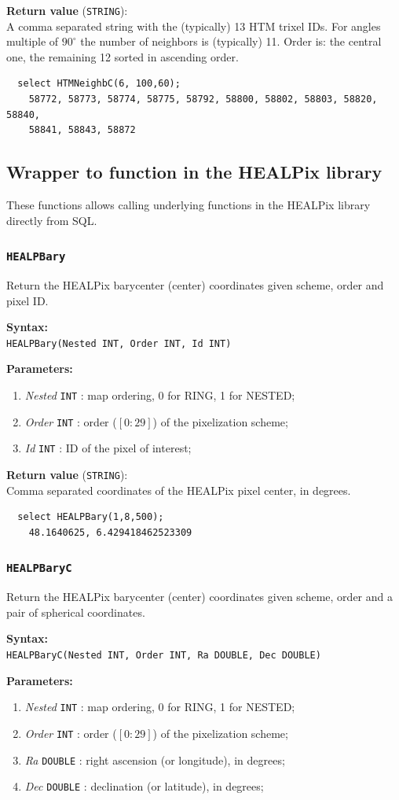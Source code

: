 \documentclass[10pt,titlepage]{article}
\def\deg{^\circ}
\newcommand{\syntax}[1]
{
  \bigskip
  \noindent
  \textbf{Syntax:} \\ 
  \indent \texttt{#1}
}
\newenvironment{parameters}
{
  \medskip
  \noindent
  \textbf{Parameters:}
  \begin{enumerate}
}
{
  \end{enumerate}
}
\newcommand{\param}[2]
{
  \item \textit{#1} \texttt{#2} 
}
\newcommand{\return}[1]
{
  \medskip
  \noindent
  \textbf{Return value} (\texttt{#1}): \\
  \indent
}
\newcommand{\example}
{
\medskip
\noindent{\textbf{Example:}}
}
\begin{document}
\return{STRING} A comma separated string with the (typically) 13 HTM trixel
IDs. For angles multiple of $90\deg$ the number of neighbors is (typically) 11.
Order is: the central one, the remaining 12 sorted in ascending order.

\example
%
\begin{verbatim}
  select HTMNeighbC(6, 100,60);
    58772, 58773, 58774, 58775, 58792, 58800, 58802, 58803, 58820, 58840,
    58841, 58843, 58872
\end{verbatim}
%
%

\subsection{Wrapper to function in the HEALPix library}
These functions allows calling underlying functions in the HEALPix library
directly from SQL.
%
%

\subsubsection{{\tt HEALPBary}}
Return the HEALPix barycenter (center) coordinates given scheme, order and
pixel ID.

\syntax{HEALPBary(Nested INT, Order INT, Id INT)}

\begin{parameters}
  \param{Nested}{INT}: map ordering, 0 for RING, 1 for NESTED;
  \param{Order}{INT}: order ($[0:29]$) of the pixelization scheme;
  \param{Id}{INT}: ID of the pixel of interest;
\end{parameters}

\return{STRING} Comma separated coordinates of the HEALPix pixel center, in
  degrees.

\example
%
\begin{verbatim}
  select HEALPBary(1,8,500);
    48.1640625, 6.429418462523309
\end{verbatim}
%
%

\subsubsection{{\tt HEALPBaryC}}
Return the HEALPix barycenter (center) coordinates given scheme, order and
a pair of spherical coordinates.

\syntax{HEALPBaryC(Nested INT, Order INT, Ra DOUBLE, Dec DOUBLE)}

\begin{parameters}
  \param{Nested}{INT}: map ordering, 0 for RING, 1 for NESTED;
  \param{Order}{INT}: order ($[0:29]$) of the pixelization scheme;
  \param{Ra}{DOUBLE}: right ascension (or longitude), in degrees;
  \param{Dec}{DOUBLE}: declination (or latitude), in degrees;
\end{parameters}
\end{document}
